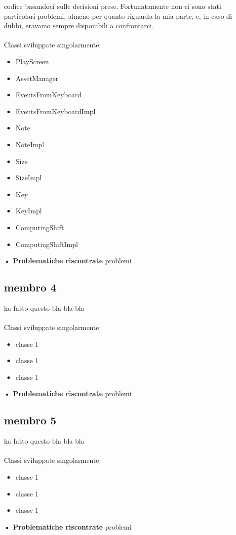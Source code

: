 \documentclass[a4paper,12pt]{report}
\begin{document}
codice basandoci sulle decisioni prese. Fortunatamente non ci sono stati particolari problemi, almeno per quanto riguarda la mia parte, e, in caso di dubbi, eravamo sempre disponibili
a confrontarci. \\ \\
Classi sviluppate singolarmente:
{
	\begin{itemize}
		\item PlayScreen
		\item AssetManager
		\item EventsFromKeyboard
		\item EventsFromKeyboardImpl
		\item Note
		\item NoteImpl
		\item Size
		\item SizeImpl
		\item Key
		\item KeyImpl
		\item ComputingShift
		\item ComputingShiftImpl
	\end{itemize}
}
\hfill\break
\textbf{• Problematiche riscontrate}\hfill\break
problemi 
\newpage

\subsection{membro 4}
ha fatto questo bla bla bla \\ \\
Classi sviluppate singolarmente:
{
	\begin{itemize}
		\item classe 1
		\item classe 1
		\item classe 1
	\end{itemize}
}
\hfill\break
\textbf{• Problematiche riscontrate}\hfill\break
problemi 
\newpage

\subsection{membro 5}
ha fatto questo bla bla bla \\ \\
Classi sviluppate singolarmente:
{
	\begin{itemize}
		\item classe 1
		\item classe 1
		\item classe 1
	\end{itemize}
}
\hfill\break
\textbf{• Problematiche riscontrate}\hfill\break
problemi 
\newpage
\end{document}

